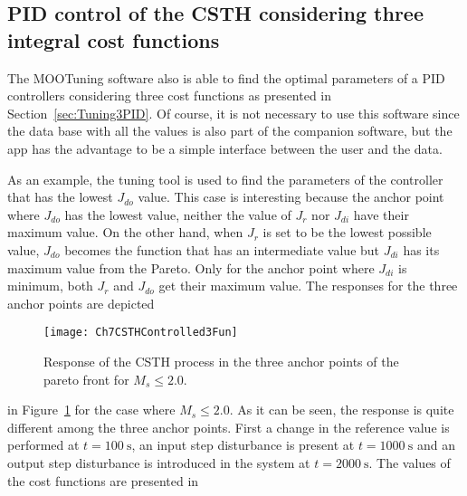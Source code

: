 \subsection{PID control of the CSTH considering three integral cost functions}
\label{sec:PIDCSTH3Fun}
The MOOTuning software also is able to find the optimal parameters of a PID controllers considering three cost functions as presented in Section~\ref{sec:Tuning3PID}. Of course, it is not necessary to use this software since the data base with all the values is also part of the companion software, but the \matlab{} app has the advantage to be a simple interface between the user and the data.

As an example, the tuning tool is used to find the parameters of the controller that has the lowest $J_{do}$ value. This case is interesting because the anchor point where $J_{do}$ has the lowest value, neither the value of $J_r$ nor $J_{di}$ have their maximum value. On the other hand, when $J_{r}$ is set to be the lowest possible value, $J_{do}$ becomes the function that has an intermediate value but $J_{di}$ has its maximum value from the Pareto. Only for the anchor point where $J_{di}$ is minimum, both $J_r$ and $J_{do}$ get their maximum value. The responses for the three anchor points are depicted %
\begin{figure}[tb]
	\centering
	\texttt{[image: Ch7CSTHControlled3Fun]}
	\caption{Response of the CSTH process in the three anchor points of the pareto front for $M_s \leq 2.0$.}
	\label{fig:Ch7CSTHControlled3Fun}
\end{figure}
%
in Figure~\ref{fig:Ch7CSTHControlled3Fun} for the case where $M_s \leq 2.0$. As it can be seen, the response is quite different among the three anchor points. First a change in the reference value is performed at $t=\SI{100}{\second}$, an input step disturbance is present at $t=\SI{1000}{\second}$ and an output step disturbance is introduced in the system at $t=\SI{2000}{\second}$. The values of the cost functions are presented in %
%
